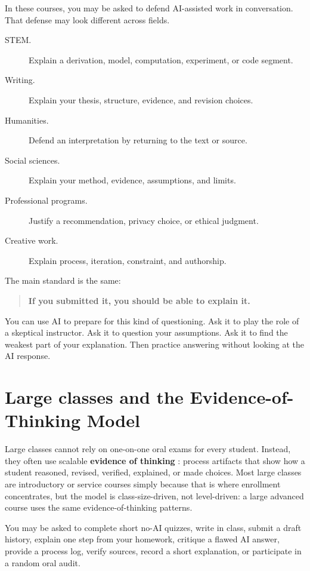 \documentclass{SIAMbook2023}
\newcommand{\keyterm}[2][\relax]{%
  \textbf{#2}%
  \ifx\relax#1\index{#2|textbf}\else\index{#1|textbf}\fi}
\begin{document}
In these courses, you may be asked to defend AI-assisted work in conversation. That defense may look different across fields.

\begin{description}
\item[STEM.] Explain a derivation, model, computation, experiment, or code segment.
\item[Writing.] Explain your thesis, structure, evidence, and revision choices.
\item[Humanities.] Defend an interpretation by returning to the text or source.
\item[Social sciences.] Explain your method, evidence, assumptions, and limits.
\item[Professional programs.] Justify a recommendation, privacy choice, or ethical judgment.
\item[Creative work.] Explain process, iteration, constraint, and authorship.
\end{description}

The main standard is the same:

\begin{quote}
\textbf{If you submitted it, you should be able to explain it.}
\end{quote}

You can use AI to prepare for this kind of questioning. Ask it to play the role of a skeptical instructor. Ask it to question your assumptions. Ask it to find the weakest part of your explanation. Then practice answering without looking at the AI response.

\section{Large classes and the Evidence-of-Thinking Model}
\label{sec:evidence-of-thinking}
\label{sec:large-classes}%

Large classes cannot rely on one-on-one oral exams for every student. Instead, they often use scalable \keyterm{evidence of thinking}: process artifacts that show how a student reasoned, revised, verified, explained, or made choices. Most large classes are introductory or service courses simply because that is where enrollment concentrates, but the model is class-size-driven, not level-driven: a large advanced course uses the same evidence-of-thinking patterns.

You may be asked to complete short no-AI quizzes, write in class, submit a draft history, explain one step from your homework, critique a flawed AI answer, provide a process log, verify sources, record a short explanation, or participate in a random oral audit.
\end{document}
